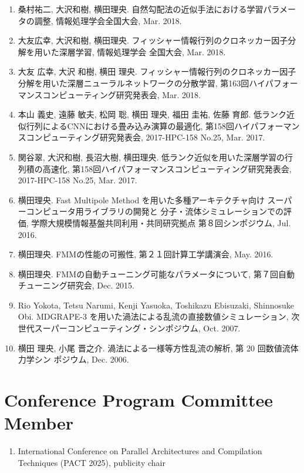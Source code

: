 \documentclass[margin,line]{cv}
\begin{document}
\begin{resume}
\begin{enumerate}
\item 桑村祐二, 大沢和樹, 横田理央. 自然勾配法の近似手法における学習パラメータの調整, 情報処理学会全国大会, Mar. 2018.

\item 大友広幸, 大沢和樹, 横田理央. フィッシャー情報行列のクロネッカー因子分解を用いた深層学習, 情報処理学会 全国大会, Mar. 2018.

\item 大友 広幸, 大沢 和樹, 横田 理央. フィッシャー情報行列のクロネッカー因子分解を用いた深層ニューラルネットワークの分散学習, 第163回ハイパフォーマンスコンピューティング研究発表会, Mar. 2018.

\item 本山 義史, 遠藤 敏夫, 松岡 聡, 横田 理央, 福田 圭祐, 佐藤 育郎. 低ランク近似行列によるCNNにおける畳み込み演算の最適化, 第158回ハイパフォーマンスコンピューティング研究発表会, 2017-HPC-158 No.25, Mar. 2017.

\item 関谷翠, 大沢和樹, 長沼大樹, 横田理央. 低ランク近似を用いた深層学習の行列積の高速化, 第158回ハイパフォーマンスコンピューティング研究発表会, 2017-HPC-158 No.25, Mar. 2017.

\item 横田理央. Fast Multipole Method を用いた多種アーキテクチャ向け スーパーコンピュータ用ライブラリの開発と 分子・流体シミュレーションでの評価, 学際大規模情報基盤共同利用・共同研究拠点 第８回シンポジウム, Jul. 2016.

\item 横田理央. FMMの性能の可搬性, 第２１回計算工学講演会, May. 2016.

\item 横田理央. FMMの自動チューニング可能なパラメータについて, 第７回自動チューニング研究会, Dec. 2015.

\item Rio Yokota, Tetsu Narumi, Kenji Yasuoka, Toshikazu Ebisuzaki, Shinnosuke Obi. MDGRAPE-3 を用いた渦法による乱流の直接数値シミュレーション, 次世代スーパーコンピューティング・シンポジウム, Oct. 2007.

\item 横田 理央, 小尾 晋之介. 渦法による一様等方性乱流の解析, 第 20 回数値流体力学シン ポジウム, Dec. 2006.
\end{enumerate}

\section{\sc Conference Program Committee Member}
\begin{enumerate}
\item International Conference on Parallel Architectures and Compilation Techniques (PACT 2025), publicity chair 


\end{enumerate}
\end{resume}
\end{document}
